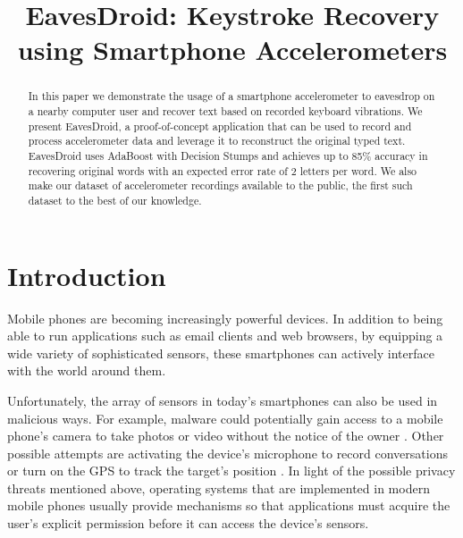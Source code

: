 \documentclass[11pt,conference]{IEEEtran}
\begin{document}
\title{EavesDroid: Keystroke Recovery using Smartphone Accelerometers}

\author{
}

\maketitle

\begin{abstract}

In this paper we demonstrate the usage of a smartphone accelerometer to eavesdrop on a nearby computer user and recover text based on recorded keyboard vibrations.
 We present EavesDroid, a proof-of-concept application that can be used to record and process accelerometer data and leverage it to reconstruct the original typed text. EavesDroid
uses AdaBoost with Decision Stumps and achieves up to 85\% accuracy in recovering original words with an expected error rate of 2 letters per word.
We also make our dataset of accelerometer recordings available to the public, the first such dataset to the best of our knowledge. 

\end{abstract}
\IEEEpeerreviewmaketitle

\section{Introduction}
\label{sec:introduction}
Mobile phones are becoming increasingly powerful
devices. In addition to being able to run applications such as email clients and web browsers, by equipping a wide variety of sophisticated sensors, these smartphones can actively interface with the world around them.

Unfortunately, the array of sensors in today's smartphones can also be
used in malicious ways. For example, malware could
potentially gain access to a mobile phone's camera to take photos or
video without the notice of the owner \cite{cheng2007mobile}. Other possible attempts are activating the device's microphone to record conversations or turn on the GPS to track the target's position
\cite{dagon2004mobile, cai2009defending, enck2010taintdroid, egele2011pios}.
In light of the possible privacy threats mentioned above, operating systems that are implemented in modern mobile phones usually provide mechanisms so that applications must acquire the user's explicit permission before it can access the device's sensors.
\end{document}
